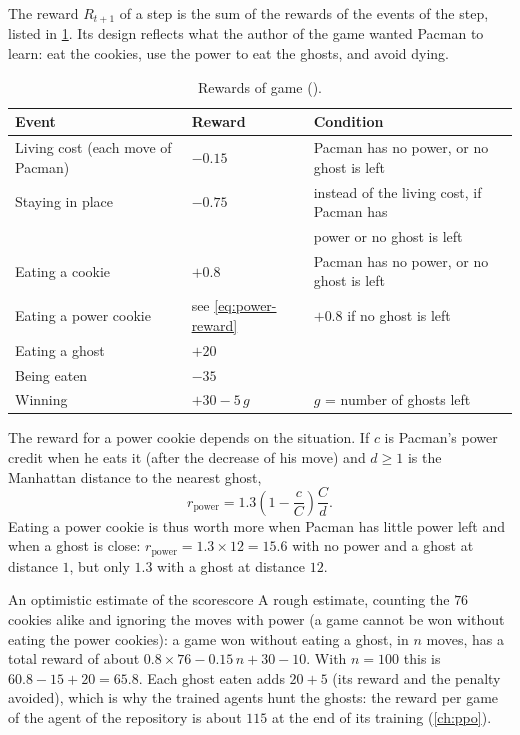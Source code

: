 The reward $R_{t+1}$ of a step is the sum of the rewards of the events of
the step, listed in \cref{tab:rewards}. Its design reflects what the
author of the game wanted Pacman to learn: eat the cookies, use the power
to eat the ghosts, and avoid dying.

\begin{table}[ht]
  \centering
  \begin{tabular}{@{}lll@{}}
    \toprule
    Event & Reward & Condition \\
    \midrule
    Living cost (each move of Pacman) & $-0.15$ &
      Pacman has no power, or no ghost is left \\
    Staying in place & $-0.75$ &
      instead of the living cost, if Pacman has \\
    & & power or no ghost is left \\
    Eating a cookie & $+0.8$ &
      Pacman has no power, or no ghost is left \\
    Eating a power cookie & see \eqref{eq:power-reward} &
      $+0.8$ if no ghost is left \\
    Eating a ghost & $+20$ & \\
    Being eaten & $-35$ & \\
    Winning & $+30 - 5\,g$ & $g$ = number of ghosts left \\
    \bottomrule
  \end{tabular}
  \caption{Rewards of game  ().}
  \label{tab:rewards}
\end{table}

The reward for a power cookie depends on the situation. If $c$ is Pacman's
power credit when he eats it (after the decrease of his move) and $d \geq 1$
is the Manhattan distance to the nearest ghost,
\begin{equation}
  \label{eq:power-reward}
  r_{\text{power}} = 1.3 \left( 1 - \frac{c}{C} \right) \frac{C}{d}.
\end{equation}
Eating a power cookie is thus worth more when Pacman has little power left
and when a ghost is close: $r_{\text{power}} = 1.3 \times 12 = 15.6$ with no
power and a ghost at distance $1$, but only $1.3$ with a ghost at distance
$12$.

\begin{pacman}{An optimistic estimate of the score}{score}
  A rough estimate, counting the $76$ cookies alike and ignoring the moves
  with power (a game cannot be won without eating the power cookies): a
  game won without eating a ghost, in $n$ moves, has a total reward of
  about $0.8 \times 76 - 0.15\,n + 30 - 10$. With
  $n = 100$ this is $60.8 - 15 + 20 = 65.8$. Each ghost eaten adds $20 + 5$
  (its reward and the penalty avoided), which is why the trained agents
  hunt the ghosts: the reward per game of the agent of the repository is
  about $115$ at the end of its training (\cref{ch:ppo}).
\end{pacman}

